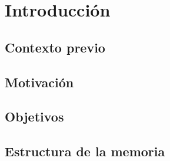 \chapter{Introducción}\label{cap:introduccion}

\section{Contexto previo}

\section{Motivación}

\section{Objetivos}

\section{Estructura de la memoria}